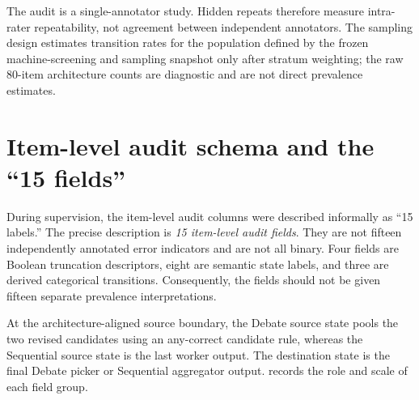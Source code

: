 The audit is a single-annotator study. Hidden repeats therefore measure intra-rater repeatability, not agreement between independent annotators. The sampling design estimates transition rates for the population defined by the frozen machine-screening and sampling snapshot only after stratum weighting; the raw 80-item architecture counts are diagnostic and are not direct prevalence estimates.

\section{Item-level audit schema and the ``15 fields''}

During supervision, the item-level audit columns were described informally as ``15 labels.'' The precise description is \emph{15 item-level audit fields}. They are not fifteen independently annotated error indicators and are not all binary. Four fields are Boolean truncation descriptors, eight are semantic state labels, and three are derived categorical transitions. Consequently, the fields should not be given fifteen separate prevalence interpretations.

At the architecture-aligned source boundary, the Debate source state pools the two revised candidates using an any-correct candidate rule, whereas the Sequential source state is the last worker output. The destination state is the final Debate picker or Sequential aggregator output.  records the role and scale of each field group.

